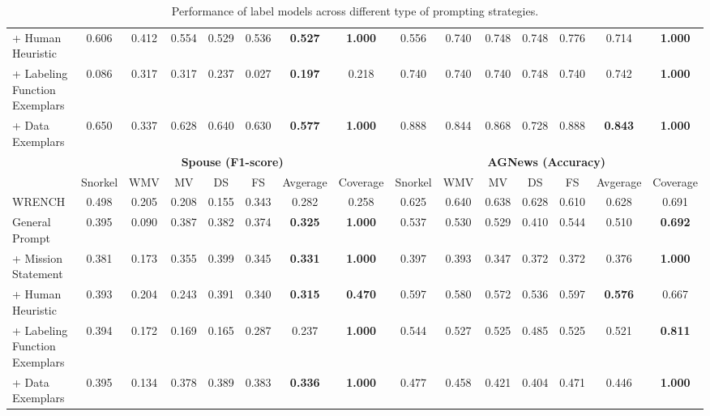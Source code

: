 \begin{table}[t!]
{\begin{tabular}{@{}l|cccccccccccccc@{}}
+ Human Heuristic & 0.606 & 0.412 & 0.554 & 0.529 & 0.536 & \textbf{0.527} & \multicolumn{1}{c|}{\textbf{1.000}} & 0.556 & 0.740 & 0.748 & 0.748 & 0.776 & 0.714 & \textbf{1.000} \\
+ Labeling Function Exemplars & 0.086 & 0.317 & 0.317 & 0.237 & 0.027 & \textbf{0.197} & \multicolumn{1}{c|}{0.218} & 0.740 & 0.740 & 0.740 & 0.748 & 0.740 & 0.742 & \textbf{1.000} \\
+ Data Exemplars & 0.650 & 0.337 & 0.628 & 0.640 & 0.630 & \textbf{0.577} & \multicolumn{1}{c|}{\textbf{1.000}} & 0.888 & 0.844 & 0.868 & 0.728 & 0.888 & \textbf{0.843} & \textbf{1.000} \\ \midrule
 & \multicolumn{7}{c|}{\textbf{Spouse (F1-score)}} & \multicolumn{7}{c}{\textbf{AGNews (Accuracy)}} \\ \cmidrule(l){2-15} 
 & Snorkel & WMV & MV & DS & FS & Avgerage & \multicolumn{1}{c|}{Coverage} & Snorkel & WMV & MV & DS & FS & Avgerage & Coverage \\ \midrule
WRENCH & 0.498 & 0.205 & 0.208 & 0.155 & 0.343 & 0.282 & \multicolumn{1}{c|}{0.258} & 0.625 & 0.640 & 0.638 & 0.628 & 0.610 & 0.628 & 0.691 \\ \midrule
General Prompt & 0.395 & 0.090 & 0.387 & 0.382 & 0.374 & \textbf{0.325} & \multicolumn{1}{c|}{\textbf{1.000}} & 0.537 & 0.530 & 0.529 & 0.410 & 0.544 & 0.510 & \textbf{0.692} \\
+ Mission Statement & 0.381 & 0.173 & 0.355 & 0.399 & 0.345 & \textbf{0.331} & \multicolumn{1}{c|}{\textbf{1.000}} & 0.397 & 0.393 & 0.347 & 0.372 & 0.372 & 0.376 & \textbf{1.000} \\
+ Human Heuristic & 0.393 & 0.204 & 0.243 & 0.391 & 0.340 & \textbf{0.315} & \multicolumn{1}{c|}{\textbf{0.470}} & 0.597 & 0.580 & 0.572 & 0.536 & 0.597 & \textbf{0.576} & 0.667 \\
+ Labeling Function Exemplars & 0.394 & 0.172 & 0.169 & 0.165 & 0.287 & 0.237 & \multicolumn{1}{c|}{\textbf{1.000}} & 0.544 & 0.527 & 0.525 & 0.485 & 0.525 & 0.521 & \textbf{0.811} \\
+ Data Exemplars & 0.395 & 0.134 & 0.378 & 0.389 & 0.383 & \textbf{0.336} & \multicolumn{1}{c|}{\textbf{1.000}} & 0.477 & 0.458 & 0.421 & 0.404 & 0.471 & 0.446 & \textbf{1.000} \\ \bottomrule
\end{tabular}}
\centering\caption{Performance of label models across different type of prompting strategies.}
\label{label model perf}
\end{table}


